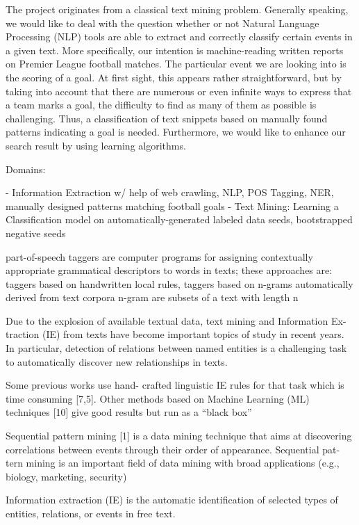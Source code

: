 \documentclass[11pt,titlepage,oneside,openany]{book}
\begin{document}
The project originates from a classical text mining problem. Generally speaking, we would like to deal with the question whether or not Natural Language Processing (NLP) tools are able to extract and correctly classify certain events in a given text. More specifically, our intention is machine-reading written reports on Premier League football matches. The particular event we are looking into is the scoring of a goal. At first sight, this appears rather straightforward, but by taking into account that there are numerous or even infinite ways to express that a team marks a goal, the difficulty to find as many of them as possible is challenging. Thus, a classification of text snippets based on manually found patterns indicating a goal is needed. Furthermore, we would like to enhance our search result by using learning algorithms.  


Domains:

- Information Extraction w/ help of web crawling, NLP, POS Tagging, NER, manually designed patterns matching football goals
- Text Mining: Learning a Classification model on automatically-generated labeled data seeds, bootstrapped negative seeds	

part-of-speech taggers are computer programs for assigning contextually appropriate grammatical descriptors to words in texts;
these approaches are: taggers based on handwritten local rules, taggers based on n-grams automatically derived from text corpora\citep[p.219]{Voutilainen2005}  n-gram are subsets of a text with length n

Due to the explosion of available textual data, text mining and Information Ex-
traction (IE) from texts have become important topics of study in recent years.
In particular, detection of relations between named entities is a challenging task
to automatically discover new relationships in texts. \citep[p.1]{Cellier2010}

Some previous works use hand-
crafted linguistic IE rules for that task which is time consuming [7,5]. Other
methods based on Machine Learning (ML) techniques [10] give good results but
run as a “black box” \citep[p.1]{Cellier2010}

Sequential pattern mining [1] is a data mining technique that aims at discovering
correlations between events through their order of appearance. Sequential pat-
tern mining is an important ﬁeld of data mining with broad applications (e.g.,
biology, marketing, security) \citep[p.1]{Cellier2010}

Information extraction (IE) is the automatic identification of selected types of entities, relations, or events in free text. \citep[p.545]{Grishman2005}
\end{document}
